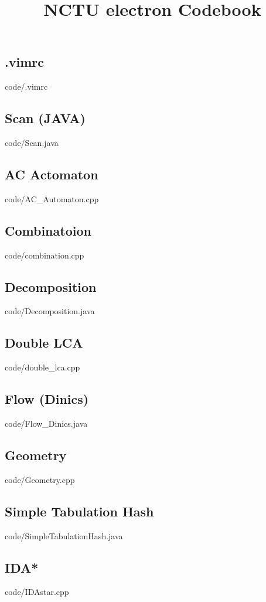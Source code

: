 \documentclass [landscape,10pt,a4paper,twocolumn,nofonts]{article}
\title {NCTU electron Codebook}
\begin{document}
\thispagestyle{fancy}
\tableofcontents
\newpage
\subsection{.vimrc}
 {code/.vimrc}
\subsection{Scan (JAVA)}
 {code/Scan.java}
\subsection{AC Actomaton}
 {code/AC_Automaton.cpp}
\subsection{Combinatoion}
 {code/combination.cpp}
\subsection{Decomposition}
 {code/Decomposition.java}
\subsection{Double LCA}
 {code/double_lca.cpp}
\subsection{Flow (Dinics)}
 {code/Flow_Dinics.java}
\subsection{Geometry}
 {code/Geometry.cpp}
\subsection{Simple Tabulation Hash}
 {code/SimpleTabulationHash.java}
\subsection{IDA*}
 {code/IDAstar.cpp}
\end{document}
